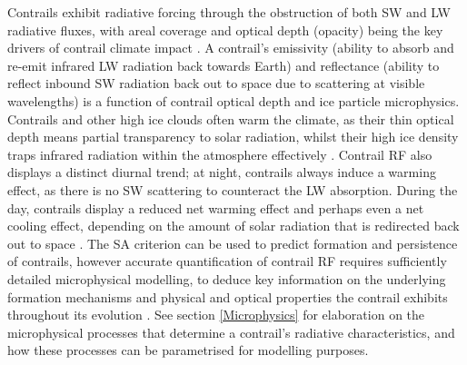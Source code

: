 
Contrails exhibit radiative forcing through the obstruction of both SW and LW radiative fluxes, with areal coverage and optical depth (opacity) being the key drivers of contrail climate impact \cite{Schumann2017}. A contrail's emissivity (ability to absorb and re-emit infrared LW radiation back towards Earth) and reflectance (ability to reflect inbound SW radiation back out to space due to scattering at visible wavelengths) is a function of contrail optical depth and ice particle microphysics. Contrails and other high ice clouds often warm the climate, as their thin optical depth means partial transparency to solar radiation, whilst their high ice density traps infrared radiation within the atmosphere effectively \cite{Karcher2018}. Contrail RF also displays a distinct diurnal trend; at night, contrails always induce a warming effect, as there is no SW scattering to counteract the LW absorption. During the day, contrails display a reduced net warming effect and perhaps even a net cooling effect, depending on the amount of solar radiation that is redirected back out to space \cite{Newinger2012}. The SA criterion can be used to predict formation and persistence of contrails, however accurate quantification of contrail RF requires sufficiently detailed microphysical modelling, to deduce key information on the underlying formation mechanisms and physical and optical properties the contrail exhibits throughout its evolution \cite{Karcher2015}. See section \ref{Microphysics} for elaboration on the microphysical processes that determine a contrail's radiative characteristics, and how these processes can be parametrised for modelling purposes.


